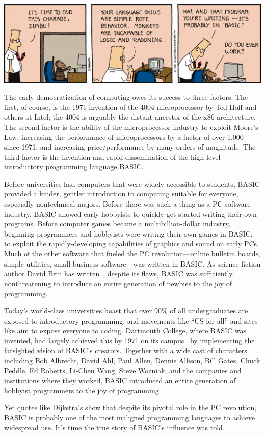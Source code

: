 

\includegraphics[width=\textwidth]{figs/dilbert-1991-12-04.png}

The early democratization of computing owes its success to three
factors.  The first, of course, is the 1971 invention of the 4004 microprocessor
by Ted Hoff and others at 
Intel; the 4004 is arguably the distant ancestor of the x86
architecture.
The second factor is the ability of the microprocessor industry
to exploit Moore's Law,
increasing the performance of microprocessors by a factor of over 1,000
since 1971, and  increasing
price/performance by many orders of magnitude.
The third factor is the invention and rapid dissemination of the
high-level introductory programming language BASIC.

Before universities had computers that were widely accessible to students, BASIC
provided a kinder, gentler introduction to computing suitable for
everyone, especially nontechnical majors.
Before there was such a thing as a PC software industry, 
BASIC allowed early hobbyists to quickly get started writing their own
programs.
Before computer games became a multibillion-dollar industry, beginning
programmers and hobbyists were writing their own games in BASIC, to
exploit the rapidly-developing capabilities of graphics and sound on
early PCs. 
Much of the other software that fueled the PC revolution---online
bulletin boards, simple utilities, small-business software---was written
in BASIC. 
As science fiction author David Brin has written~\cite{why_johnny_cant_code},
despite its flaws, BASIC
was sufficiently nonthreatening to introduce an entire generation of
newbies to the joy of programming.

Today's world-class universities boast that over 90\% of all
undergraduates are exposed to introductory programming, and movements
like ``CS for all'' and sites like  aim to expose everyone
to coding.
Dartmouth College, where BASIC was invented, had largely
achieved this by 1971 on its campus~\cite{man_and_computer} by implementing the
farsighted vision of BASIC's creators.
Together with a wide cast of characters including Bob
Albrecht, David Ahl, Paul Allen, Dennis Allison, Bill Gates, Chuck
Peddle, Ed Roberts, Li-Chen Wang, Steve Wozniak, and the companies and
institutions where they worked, BASIC introduced an entire generation
of hobbyist programmers to the joy of programming.

Yet quotes like Dijkstra's show that despite its pivotal role in the PC
revolution, BASIC is probably one of the most maligned programming
languages to achieve widespread use.  It's time the true story of
BASIC's influence was told.
